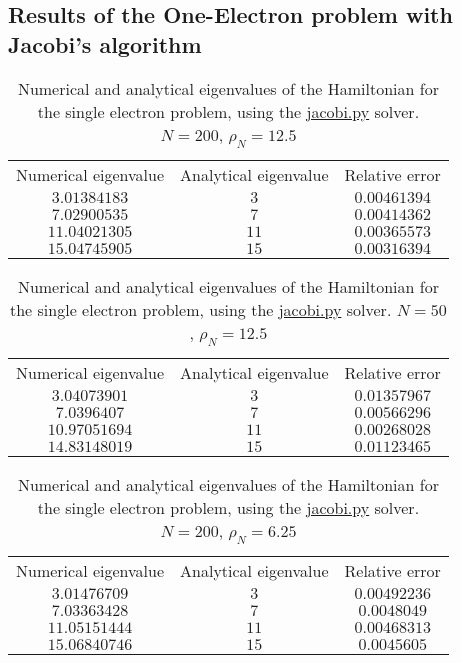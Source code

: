 \documentclass[english,notitlepage,reprint]{revtex4-1}  %
\begin{document}
\subsection{Results of the One-Electron problem with Jacobi's algorithm}\label{subsec:43}
\begin{table}[H]
	\label{tab:431}
	\centering
	\begin{tabular}{|c|c|c|}
	Numerical eigenvalue & Analytical eigenvalue & Relative error \\
	\(3.01384183\)	& \(3\) & \(0.00461394\) \\
	\(7.02900535\) & \(7\) & \(0.00414362\) \\
	\(11.04021305\) & \(11\) & \(0.00365573\) \\
	\(15.04745905\) & \(15\) & \(0.00316394\) \\
	\end{tabular}
	\caption{Numerical and analytical eigenvalues of the Hamiltonian for
	the single electron problem, using the \hyperref[A:2]{jacobi.py} solver. \(N=200\),
	\(\rho_{N}=12.5\)}
\end{table}
\begin{table}[H]
	\label{tab:432}
	\centering
	\begin{tabular}{|c|c|c|}
	Numerical eigenvalue & Analytical eigenvalue & Relative error \\
	\(3.04073901\)	& \(3\) & \(0.01357967\) \\
	\(7.0396407\) & \(7\) & \(0.00566296\) \\
	\(10.97051694\) & \(11\) & \(0.00268028\) \\
	\(14.83148019\) & \(15\) & \(0.01123465\) \\
	\end{tabular}
	\caption{Numerical and analytical eigenvalues of the Hamiltonian for
	the single electron problem, using the \hyperref[A:2]{jacobi.py} solver. \(N=50\),
	\(\rho_{N}=12.5\)}
\end{table}
\begin{table}[H]
	\label{tab:433}
	\centering
	\begin{tabular}{|c|c|c|}
	Numerical eigenvalue & Analytical eigenvalue & Relative error \\
	\(3.01476709\)	& \(3\) & \(0.00492236\) \\
	\(7.03363428\) & \(7\) & \(0.0048049\) \\
	\(11.05151444\) & \(11\) & \(0.00468313\) \\
	\(15.06840746\) & \(15\) & \(0.0045605\) \\
	\end{tabular}
	\caption{Numerical and analytical eigenvalues of the Hamiltonian for
	the single electron problem, using the \hyperref[A:2]{jacobi.py} solver. \(N=200\),
	\(\rho_{N}=6.25\)}
\end{table}
\end{document}
